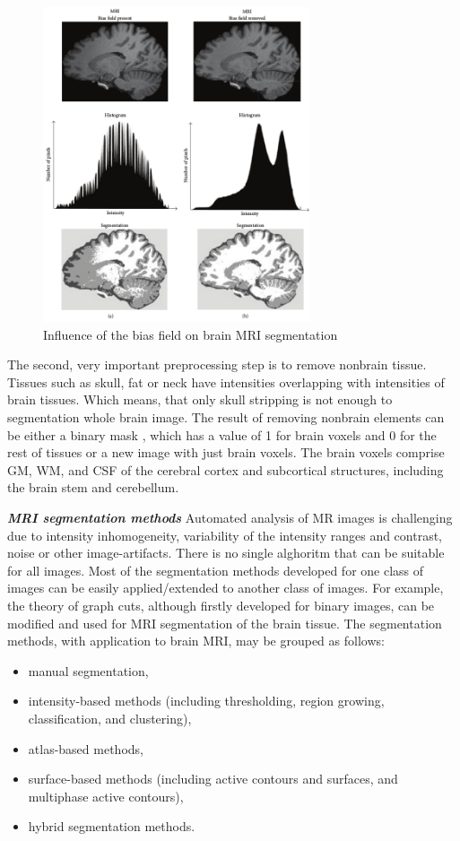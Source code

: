 \begin{figure}[H]
\centering{}\includegraphics[width=0.7\textwidth]{./figures/Module_09/m09_3}\caption{Influence of the bias field on brain MRI segmentation  \label{fig:figures/m09_3}}
\end{figure}

The second, very important preprocessing step is to remove nonbrain tissue. Tissues such as skull, fat or neck have intensities overlapping with intensities of brain tissues. Which means, that only skull stripping is not enough to segmentation whole brain image. The result of removing nonbrain elements can be either a binary mask , which has a value of 1 for brain voxels and 0 for the rest of tissues or a new image with just brain voxels. The brain voxels comprise GM, WM, and CSF of the cerebral cortex and subcortical structures, including the brain stem and cerebellum.

\textbf{\textit{MRI segmentation methods}}
Automated analysis of MR images is challenging due to intensity inhomogeneity, variability of the intensity ranges and contrast, noise or other image-artifacts. There is no single alghoritm that can be suitable for all images. Most of the segmentation methods developed for one class of images can be easily applied/extended to another class of images. For example, the theory of graph cuts, although firstly developed for binary images, can be modified and used for MRI segmentation of the brain tissue. The segmentation methods, with application to brain MRI, may be grouped as follows:
\begin{itemize}
\item manual segmentation, 
\item intensity-based methods (including thresholding, region growing, classification, and clustering),
\item atlas-based methods,
\item surface-based methods (including active contours and surfaces, and multiphase active contours),
\item hybrid segmentation methods.
\end{itemize}

